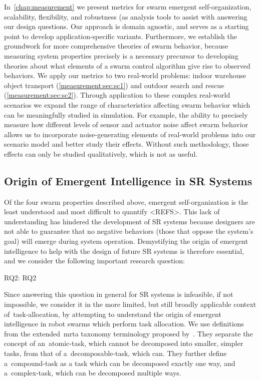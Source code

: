 \noindent
In~\cref{chap:measurement} we present metrics for swarm emergent
self-organization, scalability, flexibility, and robustness (as analysis tools
to assist with answering our design questions. Our approach is domain agnostic,
and serves as a starting point to develop application-specific
variants. Furthermore, we establish the groundwork for more comprehensive
theories of swarm behavior, because measuring system properties precisely is a
necessary precursor to developing theories about what elements of a swarm
control algorithm give rise to observed behaviors. We apply our metrics to two
real-world problems: indoor warehouse object transport
(\cref{measurement:sec:sc1}) and outdoor search and rescue
(\cref{measurement:sec:sc2}).  Through application to these complex real-world
scenarios we expand the range of characteristics affecting swarm behavior which
can be meaningfully studied in simulation. For example, the ability to precisely
measure how different levels of sensor and actuator noise affect swarm behavior
allows us to incorporate noise-generating elements of real-world problems into
our scenario model and better study their effects. Without such methodology,
those effects can only be studied qualitatively, which is not as useful.

\subsection{Origin of Emergent Intelligence in SR Systems}
%
Of the four swarm properties described above, emergent self-organization is the
least understood and most difficult to quantify <REFS>. This lack of
understanding has hindered the development of SR systems because
designers are not able to guarantee that no negative behaviors (those that
oppose the system's goal) will emerge during system operation. Demystifying the
origin of emergent intelligence to help with the design of future SR
systems is therefore essential, and we consider the following important research
question:

\medskip\noindent
\gls{RQ2}: \glsdesc{RQ2}
\medskip

\noindent
Since answering this question in general for SR systems is infeasible, if
not impossible, we consider it in the more limited, but still broadly applicable
context of~\gls{task-allocation}, by attempting to understand the origin of
emergent intelligence in robot swarms which perform task allocation. We use
definitions from the extended~\gls{mrta} taxonomy terminology proposed
by~\cite{Korsah2013}.  They separate the concept of an~\gls{atomic-task}, which
cannot be decomposed into smaller, simpler tasks, from that of
a~\gls{decomposable-task}, which can. They further define a~\gls{compound-task}
as a task which can be decomposed exactly one way, and a~\gls{complex-task},
which can be decomposed multiple ways.

